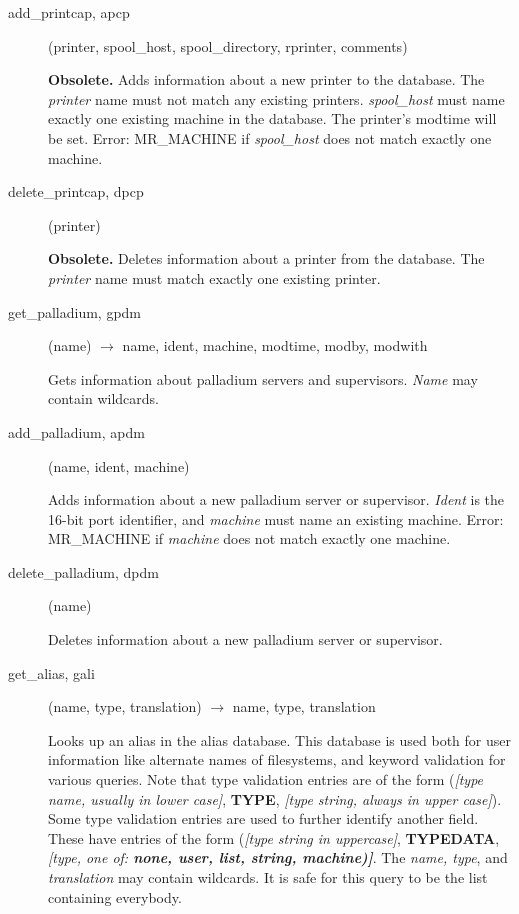 \documentclass{article}
\begin{document}
\begin{description}
\item[add\_printcap, apcp](printer, spool\_host, spool\_directory,
rprinter, comments)

{\bf Obsolete.}
Adds information about a new printer to the database.  The {\em printer}
name must not match any existing printers.  {\em spool\_host} must name
exactly one existing machine in the database.  The printer's modtime
will be set.  Error: MR\_MACHINE if {\em spool\_host} does not match
exactly one machine.

\item[delete\_printcap, dpcp](printer)

{\bf Obsolete.}
Deletes information about a printer from the database.  The
{\em printer} name must match exactly one existing printer.

\item[get\_palladium, gpdm](name) $\rightarrow$ name, ident, machine,
modtime, modby, modwith

Gets information about palladium servers and supervisors.  {\em Name}
may contain wildcards.

\item[add\_palladium, apdm](name, ident, machine)

Adds information about a new palladium server or supervisor.  {\em Ident} is
the 16-bit port identifier, and {\em machine} must name an existing
machine.  Error: MR\_MACHINE if {\em machine} does not match exactly one
machine.

\item[delete\_palladium, dpdm](name)

Deletes information about a new palladium server or supervisor.

\item[get\_alias, gali](name, type, translation) $\rightarrow$ name, type,
translation

Looks up an alias in the alias database.  This database is used both
for user information like alternate names of filesystems, and keyword
validation for various queries.  Note that type validation entries are
of the form ({\em [type name, usually in lower case]}, {\bf TYPE},
{\em [type string, always in upper case]}).  Some type validation
entries are used to further identify another field.  These have
entries of the form ({\em [type string in uppercase]}, {\bf TYPEDATA},
{\em [type, one of: {\bf none, user, list, string, machine)]}}.  The
{\em name, type}, and {\em translation} may contain wildcards.  It is safe
for this query to be the list containing everybody.


\end{description}
\end{document}
